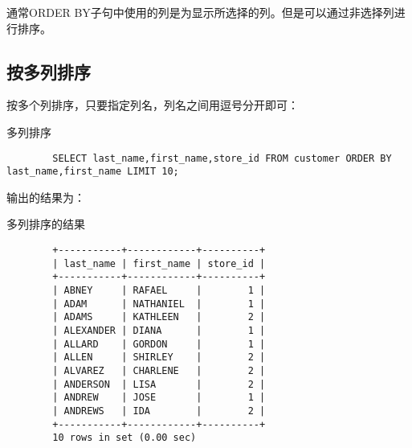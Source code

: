 \documentclass[UTF8]{article}
\begin{document}
\begin{orangebox}[frametitle={Tips 5.1}]
        通常ORDER BY子句中使用的列是为显示所选择的列。但是可以通过非选择列进行排序。
\end{orangebox}

\subsection{按多列排序}
按多个列排序，只要指定列名，列名之间用逗号分开即可：
\begin{listing}[H]
	\caption{多列排序}
	\label{code:multiplecolumnsorder}
	\begin{verbatim}
        SELECT last_name,first_name,store_id FROM customer ORDER BY last_name,first_name LIMIT 10;
    \end{verbatim}
\end{listing}

输出的结果为：

\begin{listing}[H]
	\caption{多列排序的结果}
	\label{code:multiplecolumnsorderresult}
	\begin{verbatim}
        +-----------+------------+----------+
        | last_name | first_name | store_id |
        +-----------+------------+----------+
        | ABNEY     | RAFAEL     |        1 |
        | ADAM      | NATHANIEL  |        1 |
        | ADAMS     | KATHLEEN   |        2 |
        | ALEXANDER | DIANA      |        1 |
        | ALLARD    | GORDON     |        1 |
        | ALLEN     | SHIRLEY    |        2 |
        | ALVAREZ   | CHARLENE   |        2 |
        | ANDERSON  | LISA       |        2 |
        | ANDREW    | JOSE       |        1 |
        | ANDREWS   | IDA        |        2 |
        +-----------+------------+----------+
        10 rows in set (0.00 sec)
\end{verbatim}
\end{listing}
\end{document}
